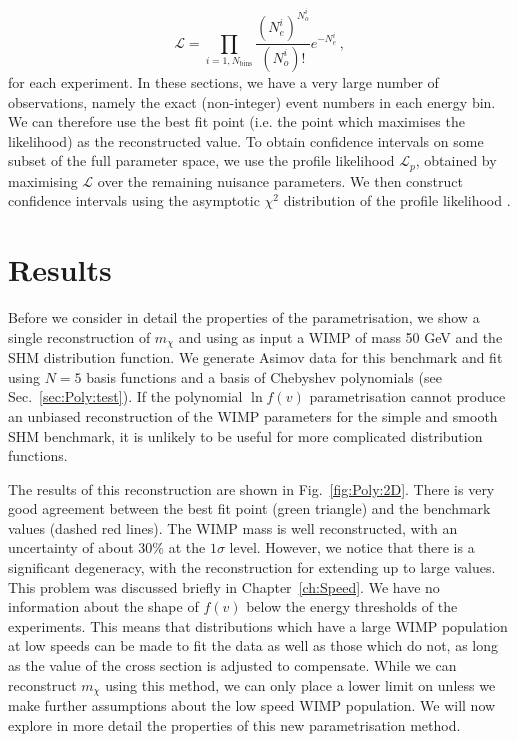 \begin{equation}
\label{eq:Poly:binnedL}
\mathcal{L} = \prod_{i = 1, N_\textrm{bins}} \frac{(N_e^i)^{N_o^i}}{(N_o^i)!}e^{-N_e^i}\,,
\end{equation}
for each experiment. In these sections, we have a very large number of observations, namely the exact (non-integer) event numbers in each energy bin. We can therefore use the best fit point (i.e. the point which maximises the likelihood) as the reconstructed value. To obtain confidence intervals on some subset of the full parameter space, we use the profile likelihood $\mathcal{L}_p$, obtained by maximising $\mathcal{L}$ over the remaining nuisance parameters. We then construct confidence intervals using the asymptotic $\chi^2$ distribution of the profile likelihood \cite{Wilks:1938}.



\section{Results}
\label{sec:Poly:results}

Before we consider in detail the properties of the parametrisation, we show a single reconstruction of $m_\chi$ and \sigmapsi using as input a WIMP of mass 50 GeV and the SHM distribution function. We generate Asimov data for this benchmark and fit using $N=5$ basis functions and a basis of Chebyshev polynomials (see Sec.~\ref{sec:Poly:test}). If the polynomial $\ln f(v)$ parametrisation cannot produce an unbiased reconstruction of the WIMP parameters for the simple and smooth SHM benchmark, it is unlikely to be useful for more complicated distribution functions.

The results of this reconstruction are shown in Fig.~\ref{fig:Poly:2D}. There is very good agreement between the best fit point (green triangle) and the benchmark values (dashed red lines). The WIMP mass is well reconstructed, with an uncertainty of about 30\% at the $1\sigma$ level. However, we notice that there is a significant degeneracy, with the reconstruction for \sigmapsi extending up to large values. This problem was discussed briefly in Chapter~\ref{ch:Speed}. We have no information about the shape of $f(v)$ below the energy thresholds of the experiments. This means that distributions which have a large WIMP population at low speeds can be made to fit the data as well as those which do not, as long as the value of the cross section is adjusted to compensate. While we can reconstruct $m_\chi$ using this method, we can only place a lower limit on \sigmapsi unless we make further assumptions about the low speed WIMP population. We will now explore in more detail the properties of this new parametrisation method.

